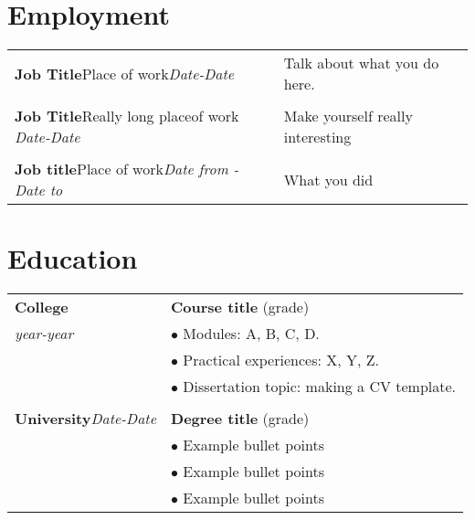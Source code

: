 \documentclass[11pt,a4paper]{moderncv}
\begin{document}
\maketitle



\section{Employment}
\begin{tabular}{p{}p{}}
\textbf{Job Title}\newline Place of work\newline \textit{Date-Date}&Talk about what you do here.\\
\\
\textbf{Job Title}\newline Really long place\newline of work \newline \textit{Date-Date}&Make yourself really interesting\\
\\
\textbf{Job title}\newline Place of work\newline \textit{Date from - Date to}&What you did \\




\end{tabular}

\section{Education}
\begin{tabular}{p{}p{}}
\textbf{College}& \textbf{Course title} (grade)\\
\textit{year-year}&$\bullet$ Modules: A, B, C, D. \\ 
&$\bullet$ Practical experiences: X, Y, Z.\\ 
&$\bullet$ Dissertation topic: making a CV template.\\
\\
\textbf{University}\newline \textit{Date-Date}& \textbf{Degree title} (grade)\\
&$\bullet$ Example bullet points\\
&$\bullet$ Example bullet points\\
&$\bullet$ Example bullet points\\
\end{tabular}
\newpage
\end{document}
